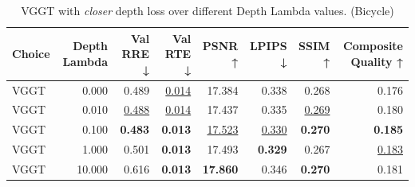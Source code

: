 \begin{table}[H]
\caption{\ifdefined\customcaption \customcaption \else VGGT with \textit{closer} depth loss over different Depth Lambda values. (Bicycle) \fi}
\label{tab:05_depth_lambda_bicycle}
\centering
\scriptsize
\begin{tabular}{lrrrrrrr}
\toprule
Choice & Depth Lambda & Val RRE ↓ & Val RTE ↓ & PSNR ↑ & LPIPS ↓ & SSIM ↑ & Composite Quality ↑ \\
\midrule
VGGT & 0.000 & 0.489 & \underline{0.014} & 17.384 & 0.338 & 0.268 & 0.176 \\
VGGT & 0.010 & \underline{0.488} & \underline{0.014} & 17.437 & 0.335 & \underline{0.269} & 0.180 \\
VGGT & 0.100 & \textbf{0.483} & \textbf{0.013} & \underline{17.523} & \underline{0.330} & \textbf{0.270} & \textbf{0.185} \\
VGGT & 1.000 & 0.501 & \textbf{0.013} & 17.493 & \textbf{0.329} & 0.267 & \underline{0.183} \\
VGGT & 10.000 & 0.616 & \textbf{0.013} & \textbf{17.860} & 0.346 & \textbf{0.270} & 0.181 \\
\bottomrule
\end{tabular}
\end{table}